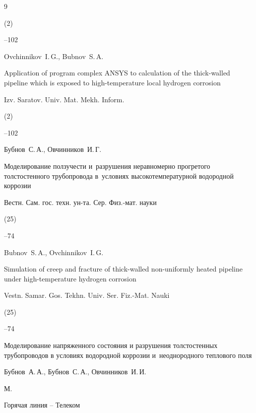 \begin{thebibliography}{9}


(2)

--102

\misctransl

\by Ovchinnikov~I.\,G., Bubnov~S.\,A.

\paper Application of program complex ANSYS to calculation of the thick-walled pipeline which is exposed to high-temperature local hydrogen corrosion

\jour Izv. Saratov. Univ. Mat. Mekh. Inform.



(2)

--102






\by Бубнов~С.\,А., Овчинников~И.\,Г.

\paper Моделирование ползучести и~разрушения неравномерно прогретого толстостенного трубопровода в~условиях высокотемпературной водородной коррозии

\jour Вестн. Сам. гос. техн. ун-та. Сер. Физ.-мат. науки


(25)

--74

\misctransl

\by Bubnov~S.\,A., Ovchinnikov~I.\,G.

\paper Simulation of creep and fracture of thick-walled non-uniformly heated pipeline under high-temperature hydrogen corrosion

\jour Vestn. Samar. Gos. Tekhn. Univ. Ser. Fiz.-Mat. Nauki


(25)

--74






\book Моделирование напряженного состояния и разрушения толстостенных трубопроводов в условиях водородной коррозии и~неоднородного теплового поля 

\by  Бубнов~А.\,А.,  Бубнов~С.\,А.,  Овчинников~И.\,И.

\publaddr М.

\publ Горячая линия – Телеком


\end{thebibliography}
